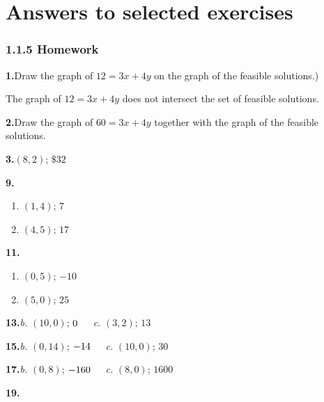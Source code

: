 \documentclass[10pt,]{book}
\theoremstyle{plain}
\theoremstyle{definition}
\theoremstyle{definition}
\theoremstyle{definition}
\numberwithin{equation}{part}
\begin{document}
\chapter[{Answers to selected exercises}]{Answers to selected exercises}\label{appendix-4}
\subsection*{1.1.5 Homework}
\noindent\textbf{1.}\quad{}Draw the graph of \(12 = 3x + 4y\) on the graph of the feasible solutions.)%
\par\smallskip
The graph of \(12 = 3x + 4y\) does not intersect the set of feasible solutions.%
\par\smallskip
\noindent\textbf{2.}\quad{}Draw the graph of \(60 = 3x + 4y\) together with the graph of the feasible solutions.%
\par\smallskip
\noindent\textbf{3.}\quad{}\((8, 2)\); \(\$32\)%
\par\smallskip
\noindent\textbf{9.}\quad{}\leavevmode%
\begin{multicols}{2}
\begin{enumerate}[label=(\alph*)]
\item\hypertarget{li-62}{}\((1,4) \); \(7\)%
\item\hypertarget{li-63}{}\((4,5) \); \(17\)%
\end{enumerate}
\end{multicols}
%
\par\smallskip
\noindent\textbf{11.}\quad{}\leavevmode%
\begin{multicols}{2}
\begin{enumerate}[label=(\alph*)]
\item\hypertarget{li-64}{}\((0,5) \); \(-10\)%
\item\hypertarget{li-65}{}\((5,0) \); \(25\)%
\end{enumerate}
\end{multicols}
%
\par\smallskip
\noindent\textbf{13.}\quad{}\emph{b.} \((10,0) \); \(0\hphantom{000}\)\emph{c.} \((3,2) \); \(13\)%
\par\smallskip
\noindent\textbf{15.}\quad{}\emph{b.} \((0,14) \); \(-14\hphantom{000}\)\emph{c.} \((10,0) \); \(30\)%
\par\smallskip
\noindent\textbf{17.}\quad{}\emph{b.} \((0,8) \); \(-160\hphantom{000}\)\emph{c.} \((8,0) \); \(1600\)%
\par\smallskip
\noindent\textbf{19.}\quad{}\leavevmode%
\end{document}

